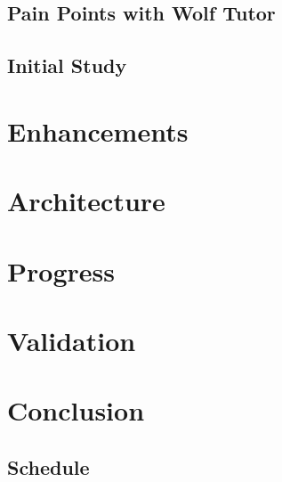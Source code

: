 \documentclass{sig-alternate-05-2015}
\begin{document}
\subsection{Pain Points with Wolf Tutor}
\label{sec:pain-points-with}

\subsection{Initial Study}
\label{sec:initial-study}

\section{Enhancements}
\label{sec:enhancements}

\section{Architecture}
\label{sec:architecture}
% 

\section{Progress}
\label{sec:progress}
% 

\section{Validation}
\label{sec:validation}
% 

\section{Conclusion}
\label{sec:conclusion}

\subsection{Schedule}
\label{sec:schedule}
% 






\end{document}
